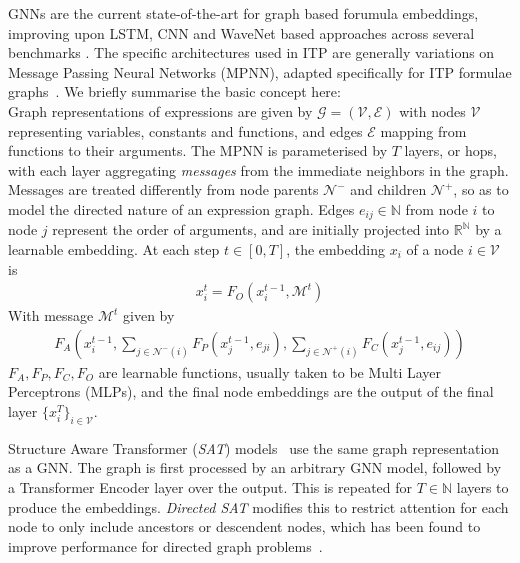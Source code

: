 \documentclass[letterpaper]{article} %
\begin{document}
    GNNs are the current state-of-the-art for graph based forumula embeddings,
    improving upon LSTM, CNN and WaveNet based approaches across several benchmarks \cite{paliwal_graph_2020, wang_premise_2017, bansal_learning_2019, crouse_improving_2020}.
    The specific architectures used in ITP are generally variations on Message Passing Neural Networks (MPNN), adapted specifically for ITP formulae graphs~\cite{paliwal_graph_2020, wang_premise_2017, bansal_learning_2019}.
    We briefly summarise the basic concept here: \\
    Graph representations of expressions are given by $\mathcal{G} = (\mathcal{V}, \mathcal{E})$ with nodes $\mathcal{V}$ representing variables, constants and functions, and edges $\mathcal{E}$ mapping from functions to their arguments.
    The MPNN is parameterised by $T$ layers, or hops, with each layer aggregating \textit{messages} from the immediate neighbors in the graph.
    Messages are treated differently from node parents $\mathcal{N}^-$ and children $\mathcal{N}^+$, so as to model the directed nature of an expression graph.
    Edges $e_{ij} \in \mathbb{N}$ from node $i$ to node $j$ represent the order of arguments, and are initially projected into $\mathbb{R}^\mathbb{N}$ by a learnable embedding.
    At each step $t \in [0, T]$, the embedding $x_i$ of a node $i \in \mathcal{V}$ is
    \begin{align*}
        x_i^{t} = F_O\left(x_i^{t -1}, \mathcal{M}^t\right)
    \end{align*}
    With message $\mathcal{M}^t$ given by
    \begin{align*}
        F_A\left(x_i^{t-1}, \sum_{j\in \mathcal{N}^{-}(i)} F_P(x_j^{t-1}, e_{ji}), \sum_{j\in \mathcal{N}^{+}(i)} F_C(x_j^{t-1}, e_{ij})\right)
    \end{align*}
    $F_A, F_P, F_C, F_O$ are learnable functions, usually taken to be Multi Layer Perceptrons (MLPs), and the final node embeddings are the output of the final layer $\{x_i^T\}_{i\in\mathcal{V}}$.

    Structure Aware Transformer (\textit{SAT}) models~\cite{chen_structure-aware_2022} use the same graph representation as a GNN. The graph is first processed by an arbitrary GNN model, followed by a Transformer Encoder layer over the output. This is repeated for $T \in \mathbb{N}$ layers to produce the embeddings.
    \textit{Directed SAT} modifies this to restrict attention for each node to only include ancestors or descendent nodes, which has been found to improve performance for directed graph problems~\cite{luo_transformers_2023}.
\end{document}
